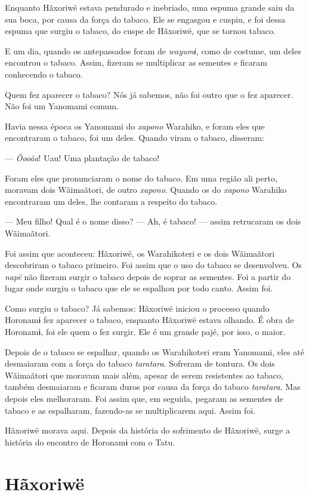 Enquanto Hãxoriwë estava pendurado e inebriado, uma espuma grande saiu
da sua boca, por causa da força do tabaco. Ele se engasgou e cuspiu, e
foi dessa espuma que surgiu o tabaco, do cuspe de Hãxoriwë, que se tornou
tabaco. 

E um dia, quando os antepassados foram de \textit{wayumɨ}, como de
costume, um deles encontrou o tabaco. Assim, fizeram se multiplicar as
sementes e ficaram conhecendo o tabaco. 

Quem fez aparecer o tabaco? Nós já sabemos, não foi outro que o fez
aparecer. Não foi um Yanomami comum. 

Havia nessa época os Yanomami do \textit{xapono} Warahiko, e foram eles
que encontraram o tabaco, foi um deles. Quando viram o tabaco,
disseram: 

--- \textit{Õooãa}! Uau! Uma plantação de tabaco! 

Foram eles que pronunciaram o nome do tabaco. Em uma região
ali perto, moravam dois Wãimaãtori, de outro \textit{xapono}. Quando os do
\textit{xapono} Warahiko encontraram um deles, lhe contaram a respeito do
tabaco. 

--- Meu filho! Qual é o nome disso? 
--- Ah, é tabaco! --- assim retrucaram os dois Wãimaãtori. 

Foi assim que aconteceu: Hãxoriwë, os Warahikoteri e os dois Wãimaãtori
descobriram o tabaco primeiro. Foi assim que o uso do tabaco se
desenvolveu. Os \textit{napë} não fizeram surgir o tabaco depois de soprar
as sementes. Foi a partir do lugar onde surgiu o tabaco que ele se
espalhou por todo canto. Assim foi. 

Como surgiu o tabaco? Já sabemos: Hãxoriwë iniciou o processo quando
Horonamɨ fez aparecer o tabaco, enquanto Hãxoriwë estava olhando. É obra
de Horonamɨ, foi ele quem o fez surgir. Ele é um grande pajé, por isso,
o maior. 

Depois de o tabaco se espalhar, quando os Warahikoteri eram Yanomami,
eles até desmaiaram com a força do tabaco \textit{taratara}. Sofreram de
tontura. Os dois Wãimaãtori que moravam mais além, apesar de serem
resistentes ao tabaco, também desmaiaram e ficaram duros por causa da
força do tabaco \textit{taratara}. Mas depois eles melhoraram. Foi assim
que, em seguida, pegaram as sementes de tabaco e as espalharam,
fazendo-as se multiplicarem aqui. Assim foi.

Hãxoriwë morava aqui. Depois da história do sofrimento de Hãxoriwë,
surge a história do encontro de Horonamɨ com o Tatu.

\chapter{Hãxoriwë}

